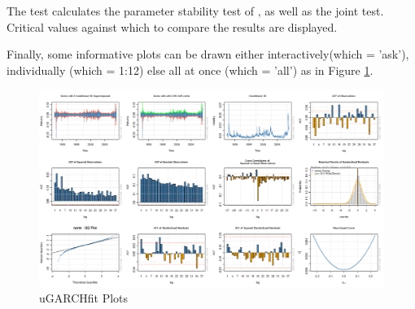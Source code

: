 The \verb@nymblom@ test calculates the parameter stability test of \citet{Nyblom},
as well as the joint test. Critical values against which to compare the results
are displayed.

Finally, some informative plots can be drawn either interactively(which = 'ask'),
individually (which = 1:12) else all at once (which = 'all') as in Figure
\ref{fig:fitplot}.

\begin{landscape}
\begin{figure}[!ht]
\centering
\includegraphics[width=22cm]{fitplot.png}
\caption[uGARCHfit Plots]{uGARCHfit Plots}\label{fig:fitplot}
\end{figure}
\end{landscape}


